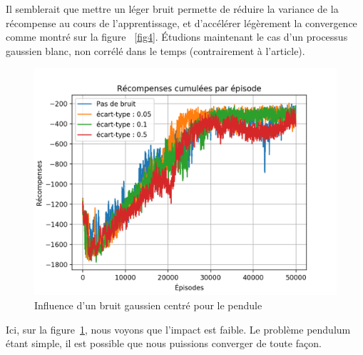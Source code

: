 \documentclass[letterpaper, french]{article}
\begin{document}
Il semblerait que mettre un léger bruit permette de réduire la variance de la récompense au cours de l'apprentissage, et d'accélérer légèrement la convergence comme montré sur la figure ~\ref{fig4}.
\smallbreak
Étudions maintenant le cas d'un processus gaussien blanc, non corrélé dans le temps (contrairement à l'article).
 
\begin{figure}
\begin{center}
\includegraphics[scale=0.5]{assiettes/pendulum_normal.png}
\caption{Influence d'un bruit gaussien centré pour le pendule}
\label{fig5}
\end{center}
\end{figure}
Ici, sur la figure~\ref{fig5}, nous voyons que l'impact est faible. Le problème pendulum étant simple, il est possible que nous puissions converger de toute façon.
\end{document}
